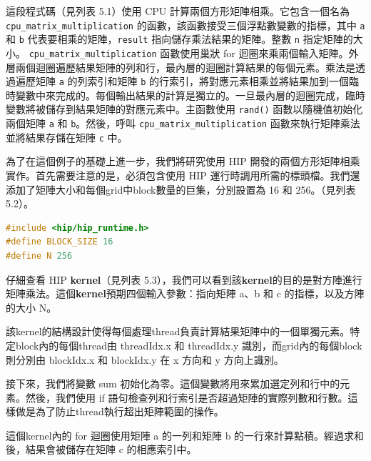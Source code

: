 這段程式碼（見列表 5.1）使用 CPU 計算兩個方形矩陣相乘。它包含一個名為 \texttt{cpu\_matrix\_multiplication} 的函數，該函數接受三個浮點數變數的指標，其中 \texttt{a} 和 \texttt{b} 代表要相乘的矩陣，\texttt{result} 指向儲存乘法結果的矩陣。整數 \texttt{n} 指定矩陣的大小。 \texttt{cpu\_matrix\_multiplication} 函數使用巢狀 for 迴圈來乘兩個輸入矩陣。外層兩個迴圈遍歷結果矩陣的列和行，最內層的迴圈計算結果的每個元素。乘法是透過遍歷矩陣 \texttt{a} 的列索引和矩陣 \texttt{b} 的行索引，將對應元素相乘並將結果加到一個臨時變數中來完成的。每個輸出結果的計算是獨立的。一旦最內層的迴圈完成，臨時變數將被儲存到結果矩陣的對應元素中。主函數使用 \texttt{rand()} 函數以隨機值初始化兩個矩陣 \texttt{a} 和 \texttt{b}。然後，呼叫 \texttt{cpu\_matrix\_multiplication} 函數來執行矩陣乘法並將結果存儲在矩陣 \texttt{c} 中。

\vspace{1em}

為了在這個例子的基礎上進一步，我們將研究使用 HIP 開發的兩個方形矩陣相乘實作。首先需要注意的是，必須包含使用 HIP 運行時調用所需的標頭檔。我們還添加了矩陣大小和每個grid中block數量的巨集，分別設置為 16 和 256。（見列表 5.2）。

\lstset{style=mystyle}
\begin{lstlisting}[language=c++,caption={標頭檔和巨集}]
#include <hip∕hip_runtime.h>
#define BLOCK_SIZE 16
#define N 256
\end{lstlisting}

\vspace{1em}
仔細查看 HIP \textbf{kernel}（見列表 5.3），我們可以看到該\textbf{kernel}的目的是對方陣進行矩陣乘法。這個\textbf{kernel}預期四個輸入參數：指向矩陣 a、b 和 c 的指標，以及方陣的大小 N。

\vspace{1em}
該kernel的結構設計使得每個處理thread負責計算結果矩陣中的一個單獨元素。特定block內的每個thread由 threadIdx.x 和 threadIdx.y 識別，而grid內的每個block則分別由 blockIdx.x 和 blockIdx.y 在 x 方向和 y 方向上識別。

\vspace{1em}
接下來，我們將變數 sum 初始化為零。這個變數將用來累加選定列和行中的元素。然後，我們使用 if 語句檢查列和行索引是否超過矩陣的實際列數和行數。這樣做是為了防止thread執行超出矩陣範圍的操作。

\vspace{1em}
這個kernel內的 for 迴圈使用矩陣 a 的一列和矩陣 b 的一行來計算點積。經過求和後，結果會被儲存在矩陣 c 的相應索引中。

